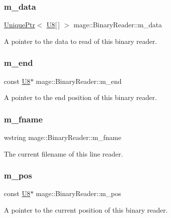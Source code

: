 \subsubsection{\texorpdfstring{m\+\_\+data}{m\_data}}
{\footnotesize\ttfamily \mbox{\hyperlink{namespacemage_a3316d7143a973e37adf1110f2e80ca31}{Unique\+Ptr}}$<$ \mbox{\hyperlink{namespacemage_afc638980bc6154f15af5e2d93a0e0ea9}{U8}}\mbox{[}$\,$\mbox{]} $>$ mage\+::\+Binary\+Reader\+::m\+\_\+data\hspace{0.3cm}{\ttfamily [private]}}

A pointer to the data to read of this binary reader. \mbox{\label{classmage_1_1_binary_reader_a19b0f36cb1e8a05aaa9471514242e8ef}} 
\subsubsection{\texorpdfstring{m\+\_\+end}{m\_end}}
{\footnotesize\ttfamily const \mbox{\hyperlink{namespacemage_afc638980bc6154f15af5e2d93a0e0ea9}{U8}}$\ast$ mage\+::\+Binary\+Reader\+::m\+\_\+end\hspace{0.3cm}{\ttfamily [private]}}

A pointer to the end position of this binary reader. \mbox{\label{classmage_1_1_binary_reader_a9c97c02d53ce60a9952751ad4f55414f}} 
\subsubsection{\texorpdfstring{m\+\_\+fname}{m\_fname}}
{\footnotesize\ttfamily wstring mage\+::\+Binary\+Reader\+::m\+\_\+fname\hspace{0.3cm}{\ttfamily [private]}}

The current filename of this line reader. \mbox{\label{classmage_1_1_binary_reader_aedb9632de1cf95d5af49499217744ed5}} 
\subsubsection{\texorpdfstring{m\+\_\+pos}{m\_pos}}
{\footnotesize\ttfamily const \mbox{\hyperlink{namespacemage_afc638980bc6154f15af5e2d93a0e0ea9}{U8}}$\ast$ mage\+::\+Binary\+Reader\+::m\+\_\+pos\hspace{0.3cm}{\ttfamily [private]}}

A pointer to the current position of this binary reader. 
